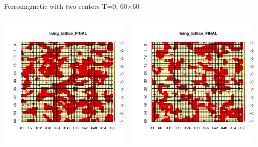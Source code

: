 \documentclass{beamer}
\begin{document}
\begin{frame}{Ferromagnetic with two centers T=0,  60$\times$60}
\begin{columns}
\begin{column}{0.5\textwidth}
    \begin{center}
     \includegraphics[width=\textwidth]{Pic/J+1_60_10000_T=0_FINAL.pdf}
     \end{center}
\end{column}
\begin{column}{0.5\textwidth}
    \begin{center}
     \includegraphics[width=\textwidth]{Pic/J+1_60_10000_T=0_2_FINAL.pdf}
     \end{center}
\end{column}
\end{columns}
\end{frame}
\end{document}

